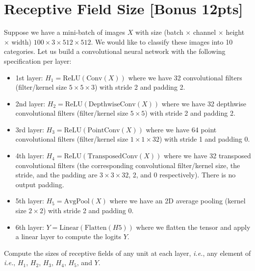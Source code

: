 \documentclass{article}
\begin{document}
\section{Receptive Field Size [Bonus 12pts]}
\noindent
Suppose we have a mini-batch of images $X$ with size (batch $\times$ channel $\times$ height $\times$ width) $100 \times 3 \times 512 \times 512$. We would like to classify these images into 10 categories. Let us build a convolutional neural network with the following specification per layer:
\begin{itemize}
    \item 1st layer: $H_1 = \text{ReLU}(\text{Conv}(X))$ where we have 32 convolutional filters (filter/kernel size $5 \times 5 \times 3$) with stride 2 and padding 2.
    \item 2nd layer: $H_2 = \text{ReLU}(\text{DepthwiseConv}(X))$ where we have 32 depthwise convolutional filters (filter/kernel size $5 \times 5$) with stride 2 and padding 2.
    \item 3rd layer: $H_3 = \text{ReLU}(\text{PointConv}(X))$ where we have 64 point convolutional filters (filter/kernel size $1 \times 1 \times 32$) with stride 1 and padding 0.
    \item 4th layer: $H_4 = \text{ReLU}(\text{TransposedConv}(X))$ where we have 32 transposed convolutional filters (the corresponding convolutional filter/kernel size, the stride, and the padding are $3 \times 3 \times 32$, 2, and 0 respectively). There is no output padding.
    \item 5th layer: $H_5 = \text{AvgPool}(X)$ where we have an 2D average pooling (kernel size $2 \times 2$) with stride 2 and padding 0.
    \item 6th layer: $Y = \text{Linear}(\text{Flatten}(H5))$ where we flatten the tensor and apply a linear layer to compute the logits $Y$.
\end{itemize}
Compute the sizes of receptive fields of any unit at each layer, \textit{i.e.}, any element of \textit{i.e.}, $H_1$, $H_2$, $H_3$, $H_4$, $H_5$, and $Y$.\\
\end{document}
